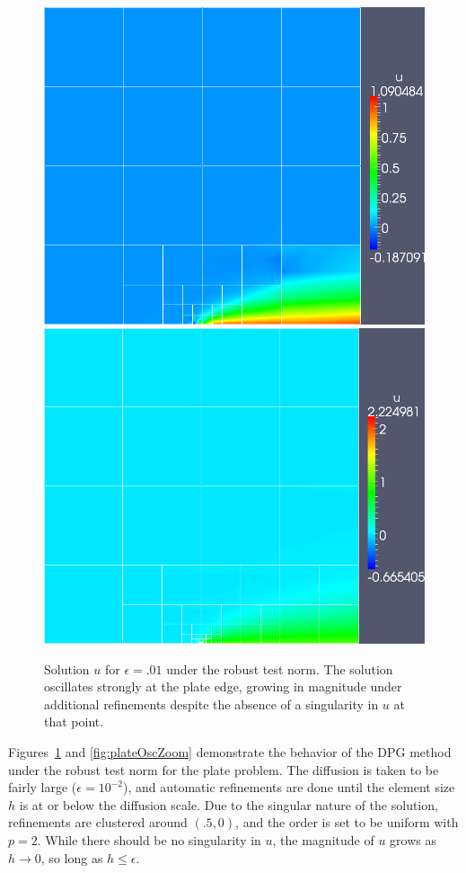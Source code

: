 \documentclass[letterpaper]{article}
\begin{document}
\begin{figure}[!h]
\centering
\includegraphics[scale=.275]{figs/LaplaceFigs/confusion1e2h1e2.png}
\includegraphics[scale=.275]{figs/LaplaceFigs/confusion1e2h1e3.png}
\caption{Solution $u$ for $\epsilon = .01$ under the robust test norm.  The
solution oscillates strongly at the plate edge, growing in magnitude under
additional refinements despite the absence of a singularity in $u$ at that
point.}
\label{fig:plateOsc}
\end{figure}

Figures~\ref{fig:plateOsc} and \ref{fig:plateOscZoom} demonstrate the behavior
of the DPG method under the robust test norm for the plate problem.  The
diffusion is taken to be fairly large ($\epsilon = 10^{-2}$), and automatic
refinements are done until the element size $h$ is at or below the diffusion
scale.  Due to the singular nature of the solution, refinements are clustered
around $(.5,0)$, and the order is set to be uniform with $p=2$.  While there
should be no singularity in $u$, the magnitude of $u$ grows as $h \rightarrow
0$, so long as $h\leq \epsilon$.
\end{document}
